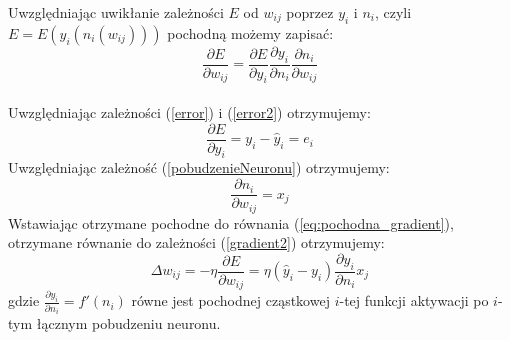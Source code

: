 \documentclass[a4paper, openright, twoside,11pt]{article}
\begin{document}
    Uwzględniając uwikłanie zależności $E$ od $w_{ij}$ poprzez $y_i$ i $n_i$, czyli $E = E(y_i(n_i(w_{ij})))$ pochodną możemy zapisać:\\
    \begin{equation}
    \label{eq:pochodna_gradient}
    \frac{\partial E}{\partial w_{ij}} = \frac{\partial E}{\partial y_i}  \frac{\partial y_i}{\partial n_i}  \frac{\partial n_i}{\partial w_{ij}}
    \end{equation}\\
    Uwzględniając zależności (\ref{error}) i (\ref{error2}) otrzymujemy:
    \begin{equation}
    \frac{\partial E}{\partial y_i} = y_i - \hat{y}_i = e_i
    \end{equation}
    Uwzględniając zależność (\ref{pobudzenieNeuronu}) otrzymujemy:
    \begin{equation}
    \frac{\partial n_i}{\partial w_{ij}} = x_j
    \end{equation}
    Wstawiając otrzymane pochodne do równania (\ref{eq:pochodna_gradient}), otrzymane równanie do zależności (\ref{gradient2}) otrzymujemy:
    \begin{equation}
        \label{gradient_podstawione}
        \Delta  w_{ij} = - \eta \frac{\partial E}{\partial w_{ij}} = \eta (\hat{y}_i - y_i) \frac{\partial y_i}{\partial n_i} x_j
    \end{equation}
    gdzie
    $\frac{\partial y_i}{\partial n_i} = f'(n_i)$ równe jest pochodnej cząstkowej $i$-tej funkcji aktywacji po $i$-tym łącznym pobudzeniu neuronu.
    
    \clearpage
\end{document}
